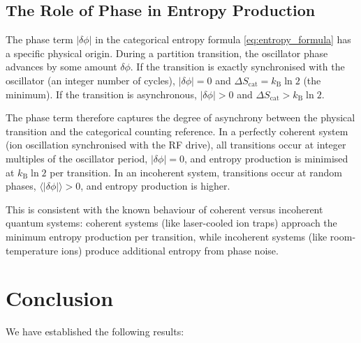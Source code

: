 \documentclass[twocolumn,10pt]{article}
\newcommand{\kB}{k_{\mathrm{B}}}
\newcommand{\Scat}{S_{\mathrm{cat}}}
\begin{document}
\subsection{The Role of Phase in Entropy Production}

The phase term $|\delta\phi|$ in the categorical entropy formula \eqref{eq:entropy_formula} has a specific physical origin. During a partition transition, the oscillator phase advances by some amount $\delta\phi$. If the transition is exactly synchronised with the oscillator (an integer number of cycles), $|\delta\phi| = 0$ and $\Delta\Scat = \kB\ln 2$ (the minimum). If the transition is asynchronous, $|\delta\phi| > 0$ and $\Delta\Scat > \kB\ln 2$.

The phase term therefore captures the degree of asynchrony between the physical transition and the categorical counting reference. In a perfectly coherent system (ion oscillation synchronised with the RF drive), all transitions occur at integer multiples of the oscillator period, $|\delta\phi| = 0$, and entropy production is minimised at $\kB\ln 2$ per transition. In an incoherent system, transitions occur at random phases, $\langle|\delta\phi|\rangle > 0$, and entropy production is higher.

This is consistent with the known behaviour of coherent versus incoherent quantum systems: coherent systems (like laser-cooled ion traps) approach the minimum entropy production per transition, while incoherent systems (like room-temperature ions) produce additional entropy from phase noise.

\section{Conclusion}
\label{sec:conclusion}

We have established the following results:
\end{document}
